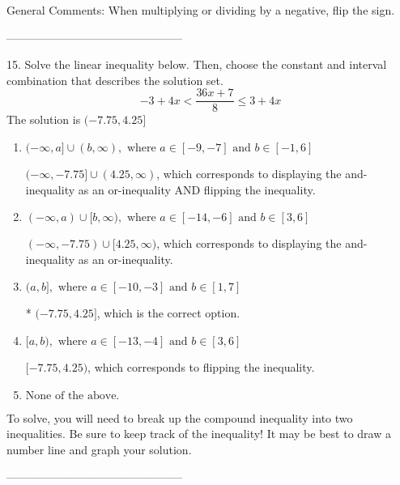 \documentclass{article}[14pt]
\begin{document}
General Comments: When multiplying or dividing by a negative, flip the sign.

-----------------------------------------------

15. Solve the linear inequality below. Then, choose the constant and interval combination that describes the solution set.
$$ -3 + 4 x < \frac{36 x + 7}{8} \leq 3 + 4 x $$ 
The solution is $ (-7.75, 4.25] $ 

\begin{enumerate}[label=\Alph*.] 
\item $ (-\infty, a] \cup (b, \infty), \text{ where } a \in [-9, -7] \text{ and } b \in [-1, 6] $ 

 $(-\infty, -7.75] \cup (4.25, \infty)$, which corresponds to displaying the and-inequality as an or-inequality AND flipping the inequality. 
\item $ (-\infty, a) \cup [b, \infty), \text{ where } a \in [-14, -6] \text{ and } b \in [3, 6] $ 

 $(-\infty, -7.75) \cup [4.25, \infty)$, which corresponds to displaying the and-inequality as an or-inequality. 
\item $ (a, b], \text{ where } a \in [-10, -3] \text{ and } b \in [1, 7] $ 

 * $(-7.75, 4.25]$, which is the correct option. 
\item $ [a, b), \text{ where } a \in [-13, -4] \text{ and } b \in [3, 6] $ 

 $[-7.75, 4.25)$, which corresponds to flipping the inequality. 
\item $ \text{None of the above.} $ 

  
\end{enumerate} 
 
To solve, you will need to break up the compound inequality into two inequalities. Be sure to keep track of the inequality! It may be best to draw a number line and graph your solution.

-----------------------------------------------
\end{document}
